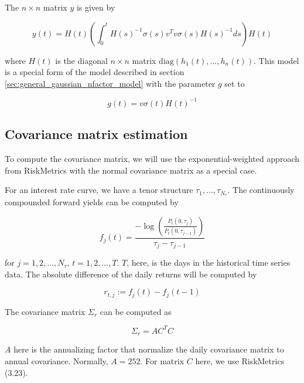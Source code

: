 \documentclass{amsart}
\theoremstyle{plain}
\numberwithin{equation}{section}
\begin{document}
The $n \times n$ matrix $y$ is given by

\begin{equation}
y(t) = H(t) \left( \int_0^t H(s)^{-1} \sigma(s) v^T v \sigma(s) H(s)^{-1} ds \right) H(t)
\end{equation}

where $H(t)$ is the diagonal $n \times n$ matrix $\text{diag}(h_1(t), \ldots, h_n(t))$. This model is a special form of
the model described in section \ref{sec:general_gaussian_nfactor_model} with the parameter $g$ set to

\begin{equation}
g(t) = v \sigma(t) H(t)^{-1}
\end{equation}

\subsection{Covariance matrix estimation}\label{sec:covariance_matrix_estimation}

To compute the covariance matrix, we will use the exponential-weighted approach from RiskMetrics with the normal
covariance matrix as a special case.

For an interest rate curve, we have a tenor structure $\tau_1, \ldots, \tau_{N_\tau}$. The continuously compounded
forward yields can be computed by

\begin{equation}\label{cont_comp_forward_p}
f_j(t) = \frac{-\log \left( \frac{P_t(0, \tau_j)}{P_t(0, \tau_{j-1})} \right)}{ \tau_j - \tau_{j-1} }
\end{equation}

for $j = 1, 2, \ldots, N_\tau$, $t = 1, 2, \ldots, T$. $T$, here, is the days in the historical time series data. The
absolute difference of the daily returns will be computed by

\begin{equation}\label{abs_daily_return_p}
r_{t, j} := f_j(t) - f_j(t-1)
\end{equation}

The covariance matrix $\Sigma_r$ can be computed as

\begin{equation}\label{cov_mat}
\Sigma_r = A C^T C
\end{equation}

$A$ here is the annualizing factor that normalize the daily covariance matrix to annual covariance. Normally,
$A=252$. For matrix $C$ here, we use RiskMetrics (3.23).
\end{document}
